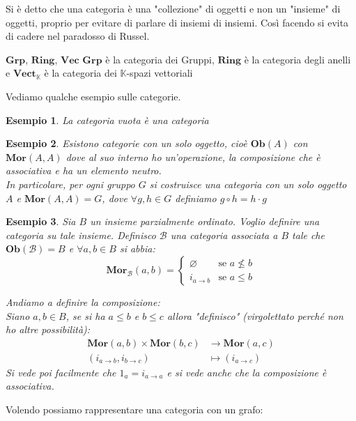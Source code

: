 \documentclass[11pt,a4paper,twoside]{article}
\newtheorem{es}{Esempio}
\theoremstyle{definition}
\begin{document}
Si è detto che una categoria è una "collezione" di oggetti e non un "insieme" di oggetti, proprio per evitare di parlare di insiemi di insiemi. Così facendo si evita di cadere nel paradosso di Russel.

\begin{defn}{$\bm{Grp}$, $\bm{Ring}$, $\bm{Vec}$}{}
	$\bm{Grp}$ è la categoria dei Gruppi, $\bm{Ring}$ è la categoria degli anelli e $\bm{Vect}_{\mathbb K}$ è la categoria dei $\mathbb K$-spazi vettoriali
\end{defn}

Vediamo qualche esempio sulle categorie.

\begin{es}
	La categoria vuota è una categoria
\end{es}

\begin{es}
	Esistono categorie con un solo oggetto, cioè $\bm{Ob}(A)$ con $\bm{Mor}(A, A)$ dove al suo interno ho un'operazione, la composizione che è associativa e ha un elemento neutro.\\
	In particolare, per ogni gruppo $G$ si costruisce una categoria con un solo oggetto $A$ e $\bm{Mor}(A, A)=G$, dove $\forall g,h \in G$ definiamo $g \circ h = h \cdot g$
\end{es}

\begin{es}
	Sia $B$ un insieme parzialmente ordinato. Voglio definire una categoria su tale insieme. Definisco $\mathcal B$ una categoria associata a $B$ tale che $\bm{Ob}(\mathcal B) = B$ e $\forall a, b \in B$ si abbia:
	\[ \bm{Mor}_\mathcal B(a,b) = \begin{cases} \varnothing & \text{se }a \not \leq b\\ i_{a \to b} & \text{se }a \leq b \end{cases} \]

	Andiamo a definire la composizione:\\
	Siano $a,b \in B$, se si ha $a \leq b$ e $b \leq c$ allora "definisco" (virgolettato perché non ho altre possibilità):
	\begin{align*}
		\bm{Mor}(a,b) \times \bm{Mor}(b,c) & \to \bm{Mor}(a,c)\\
		(i_{a \to b}, i_{b \to c}) & \mapsto (i_{a \to c})
	\end{align*}
	Si vede poi facilmente che $1_a = i_{a \to a}$ e si vede anche che la composizione è associativa.
\end{es}

Volendo possiamo rappresentare una categoria con un grafo:
\end{document}

